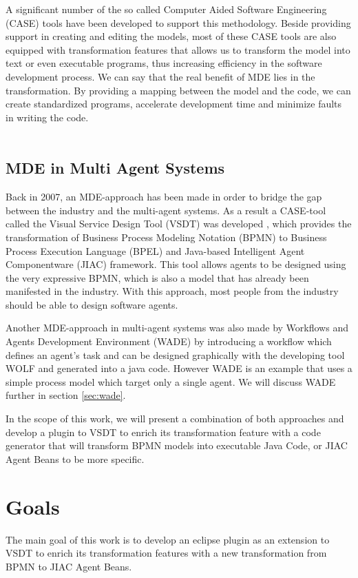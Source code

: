 A significant number of the so called Computer Aided Software Engineering (CASE) tools have been developed to support this methodology. Beside providing support in creating and editing the models, most of these CASE tools are also equipped with transformation features that allows us to transform the model into text or even executable programs, thus increasing efficiency in the software development process. We can say that the real benefit of MDE lies in the transformation. By providing a mapping between the model and the code, we can create standardized programs, accelerate development time and minimize faults in writing the code. \\\\

\subsection{MDE in Multi Agent Systems} 
Back in 2007, an MDE-approach has been made in order to bridge the gap between the industry and the multi-agent systems. As a result a CASE-tool called the Visual Service Design Tool (VSDT) was developed \cite{TK07}, which provides the transformation of Business Process Modeling Notation (BPMN) to Business Process Execution Language (BPEL) and Java-based Intelligent Agent Componentware (JIAC) framework. This tool allows agents to be designed using the very expressive BPMN, which is also a model that has already been manifested in the industry. With this approach, most people from the industry should be able to design software agents.

Another MDE-approach in multi-agent systems was also made by Workflows and Agents Development Environment (WADE) by introducing a workflow which defines an agent's task and can be designed graphically with the developing tool WOLF and generated into a java code. However WADE is an example that uses a simple process model which target only a single agent. We will discuss WADE further in section \ref{sec:wade}.

In the scope of this work, we will present a combination of both approaches and develop a plugin to VSDT to enrich its transformation feature with a code generator that will transform BPMN models into executable Java Code, or JIAC Agent Beans to be more specific.

\section{Goals}
\label{sec:Goals}
The main goal of this work is to develop an eclipse plugin as an extension to VSDT to enrich its transformation features with a new transformation from BPMN to JIAC Agent Beans. \\

